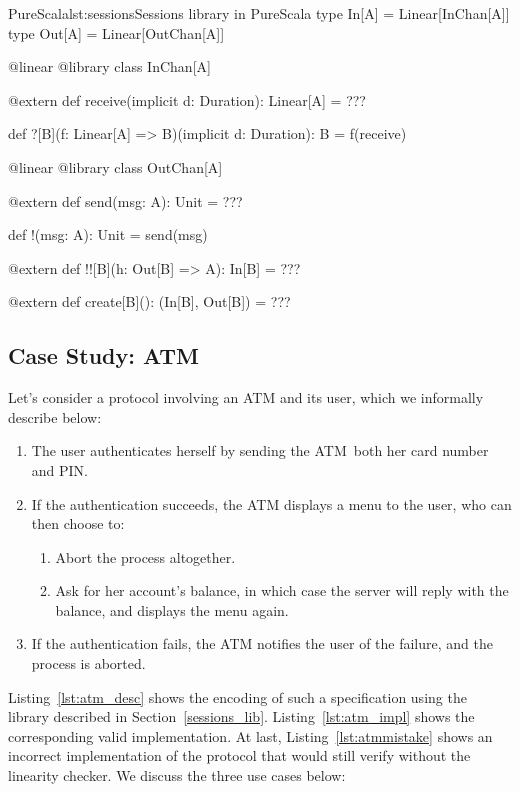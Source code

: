 \documentclass[a4paper,twoside]{article}
\newcommand{\RefSec}[1]{Section~\ref{#1}}
\newcommand{\RefCode}[1]{Listing~\ref{#1}}
\begin{document}
\begin{Code}{PureScala}{lst:sessions}{Sessions library in PureScala}
type In[A]  = Linear[InChan[A]]
type Out[A] = Linear[OutChan[A]]

@linear @library
class InChan[A] {

  @extern
  def receive(implicit d: Duration): Linear[A] = {
    ???
  }

  def ?[B](f: Linear[A] => B)(implicit d: Duration): B = {
    f(receive)
  }
}

@linear @library
class OutChan[A] {

  @extern
  def send(msg: A): Unit = {
    ???
  }

  def !(msg: A): Unit = {
    send(msg)
  }

  @extern
  def !![B](h: Out[B] => A): In[B] = {
    ???
  }

  @extern
  def create[B](): (In[B], Out[B]) = {
    ???
  }
}
\end{Code}

\subsection{Case Study: ATM}

Let's consider a protocol involving an ATM and its user, which we informally describe below:

\begin{enumerate}[label=\Alph*]
\item The user authenticates herself by sending the ATM both her card number and PIN.
\item If the authentication succeeds, the ATM displays a menu to the user, who can then choose to:
\begin{enumerate}
\item Abort the process altogether.
\item Ask for her account's balance, in which case the server will reply with the balance, and displays the menu again.
\end{enumerate}
\item If the authentication fails, the ATM notifies the user of the failure, and the process is aborted.
\end{enumerate}

\RefCode{lst:atm_desc} shows the encoding of such a specification using the library described in \RefSec{sessions_lib}. \RefCode{lst:atm_impl} shows the corresponding valid implementation. At last, \RefCode{lst:atmmistake} shows an incorrect implementation of the protocol that would still verify without the linearity checker. We discuss the three use cases below:
\end{document}

